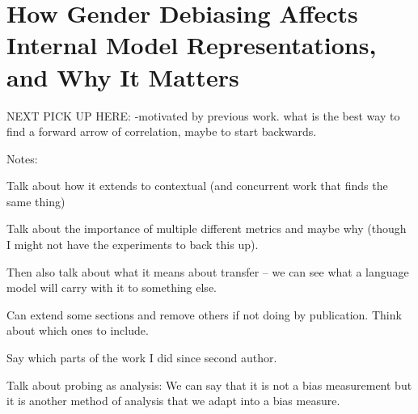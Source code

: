 \chapter{How Gender Debiasing Affects Internal Model Representations,
and Why It Matters}\label{chapter:gender_bias_probing}


NEXT PICK UP HERE:
-motivated by previous work.
what is the best way to find a forward arrow of correlation, maybe to start backwards.




Notes:

Talk about how it extends to contextual (and concurrent work that finds the same thing)

Talk about the importance of multiple different metrics and maybe why (though I might not have the experiments to back this up).

Then also talk about what it means about transfer -- we can see what a language model will carry with it to something else. 


Can extend some sections and remove others if not doing by publication. Think about which ones to include.

Say which parts of the work I did since second author. 



Talk about probing as analysis: We can say that it is not a bias measurement but it is another method of analysis that we adapt into a bias measure.